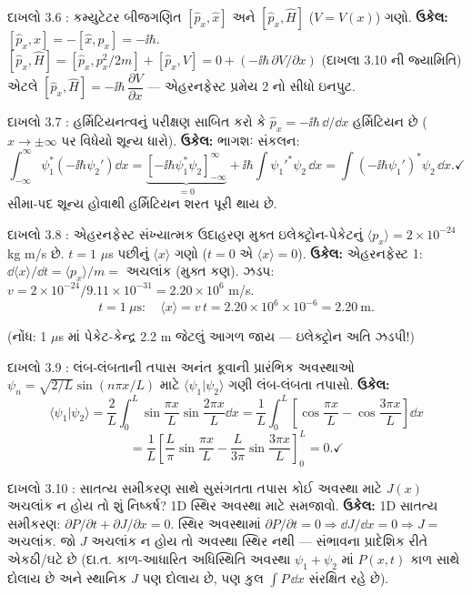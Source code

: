 \begin{dahlo}{દાખલો 3.6 : કમ્યુટેટર બીજગણિત}
$[\hat p_x,\hat x]$ અને $[\hat p_x,\hat H]$ ($V=V(x)$) ગણો.
\tcblower
\textbf{ઉકેલ:} $[\hat p_x,\hat x]=-[\hat x,\hat p_x]=-\ii\hbar$.
$[\hat p_x,\hat H]=[\hat p_x,p_x^{2}/2m]+[\hat p_x,V]=0+(-\ii\hbar\,\partial V/\partial x)$ (દાખલા 3.10 ની જ્યામિતિ)
એટલે $[\hat p_x,\hat H]=-\ii\hbar\,\dfrac{\partial V}{\partial x}$ — એહરનફેસ્ટ પ્રમેય 2 નો સીધો ઇનપુટ.
\end{dahlo}

\begin{dahlo}{દાખલો 3.7 : હર્મિટિયનત્વનું પરીક્ષણ}
સાબિત કરો કે $\hat p_x=-\ii\hbar\,\dd/\dd x$ હર્મિટિયન છે ($x\to\pm\infty$ પર વિધેયો શૂન્ય ધારો).
\tcblower
\textbf{ઉકેલ:} ભાગશઃ સંકલન:
\[
\int_{-\infty}^{\infty}\psi_1^{*}\left(-\ii\hbar\psi_2'\right)\dd x
=\underbrace{\left[-\ii\hbar\psi_1^{*}\psi_2\right]_{-\infty}^{\infty}}_{=0}
+\ii\hbar\int\psi_1'^{*}\psi_2\,\dd x
=\int\left(-\ii\hbar\psi_1'\right)^{*}\psi_2\,\dd x . \checkmark
\]
સીમા-પદ શૂન્ય હોવાથી હર્મિટિયન શરત પૂરી થાય છે.
\end{dahlo}

\begin{dahlo}{દાખલો 3.8 : એહરનફેસ્ટ સંખ્યાત્મક ઉદાહરણ}
મુક્ત ઇલેક્ટ્રોન-પેકેટનું $\langle p_x\rangle=2\times10^{-24}$ kg m/s છે. $t=1$ $\mu$s પછીનું $\langle x\rangle$ ગણો ($t=0$ એ $\langle x\rangle=0$).
\tcblower
\textbf{ઉકેલ:} એહરનફેસ્ટ 1: $\dd\langle x\rangle/\dd t=\langle p_x\rangle/m=$ અચલાંક (મુક્ત કણ).
ઝડપ: $v=2\times10^{-24}/9.11\times10^{-31}=2.20\times10^{6}$ m/s.
\[
t=1\ \mu\mathrm{s}:\quad \langle x\rangle=v\,t=2.20\times10^{6}\times10^{-6}=2.20\ \mathrm{m}.
\]

(નોંધ: 1 $\mu$s માં પેકેટ-કેન્દ્ર 2.2 m જેટલું આગળ જાય — ઇલેક્ટ્રોન અતિ ઝડપી!)
\end{dahlo}

\begin{dahlo}{દાખલો 3.9 : લંબ-લંબતાની તપાસ}
અનંત કૂવાની પ્રારંભિક અવસ્થાઓ $\psi_n=\sqrt{2/L}\sin(n\pi x/L)$ માટે $\langle\psi_1|\psi_2\rangle$ ગણી લંબ-લંબતા તપાસો.
\tcblower
\textbf{ઉકેલ:}
\[
\langle\psi_1|\psi_2\rangle=\frac{2}{L}\int_0^{L}\sin\frac{\pi x}{L}\sin\frac{2\pi x}{L}\dd x
=\frac{1}{L}\int_0^{L}\left[\cos\frac{\pi x}{L}-\cos\frac{3\pi x}{L}\right]\dd x
\]
\[
=\frac{1}{L}\left[\frac{L}{\pi}\sin\frac{\pi x}{L}-\frac{L}{3\pi}\sin\frac{3\pi x}{L}\right]_0^{L}=0 . \checkmark
\]
\end{dahlo}

\begin{dahlo}{દાખલો 3.10 : સાતત્ય સમીકરણ સાથે સુસંગતતા તપાસ}
કોઈ અવસ્થા માટે $J(x)$ અચલાંક ન હોય તો શું નિષ્કર્ષ? 1D સ્થિર અવસ્થા માટે સમજાવો.
\tcblower
\textbf{ઉકેલ:} 1D સાતત્ય સમીકરણ: $\partial P/\partial t+\partial J/\partial x=0$.
સ્થિર અવસ્થામાં $\partial P/\partial t=0\Rightarrow\dd J/\dd x=0\Rightarrow J=$ અચલાંક.
જો $J$ અચલાંક ન હોય તો અવસ્થા સ્થિર નથી — સંભાવના પ્રાદેશિક રીતે એકઠી/ઘટે છે (દા.ત. કાળ-આધારિત અધિસ્થિતિ અવસ્થા $\psi_1+\psi_2$ માં $P(x,t)$ કાળ સાથે દોલાય છે અને સ્થાનિક $J$ પણ દોલાય છે, પણ કુલ $\int P\,\dd x$ સંરક્ષિત રહે છે).
\end{dahlo}

